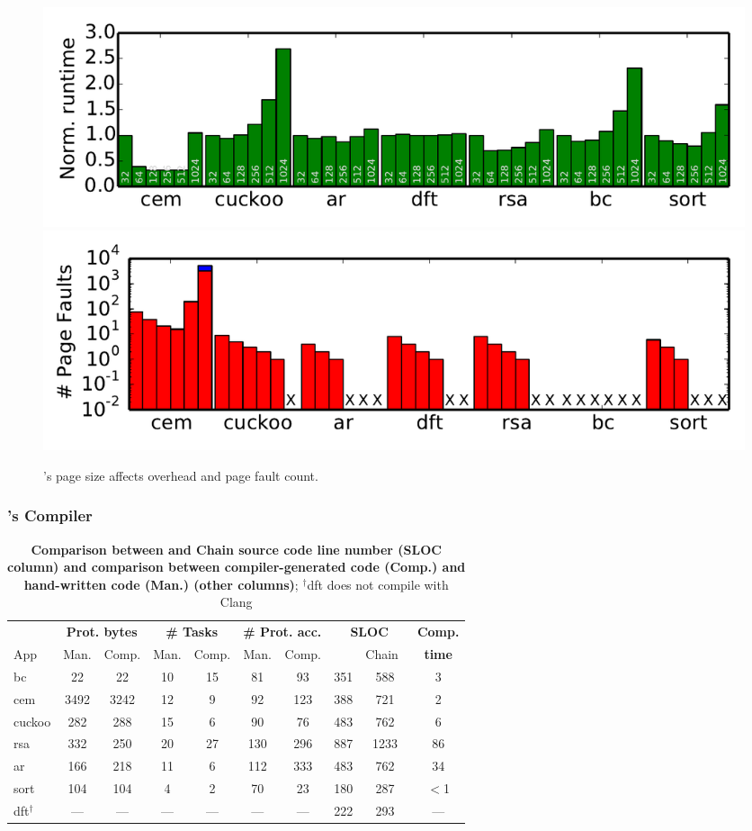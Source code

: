 \begin{figure}
	\centering
	\includegraphics[width=\columnwidth]{figures/ramPagsSizes}
	\includegraphics[width=\columnwidth]{figures/pagefault}
	\caption{\sys's page size affects overhead and page fault count.}
	\label{fig:IPOSPerformance}
	\label{fig:page_size}
\end{figure}

\subsubsection{\sys's Compiler}
\label{sec:result_compiler_time}

\begin{table}[t]
	\centering
	\footnotesize
	\renewcommand{\tabcolsep}{1pt}
	\begin{tabular}{|l|cc|cc|cc|cc|c|}
		\hline
		{} & \multicolumn{2}{c|}{{\bf Prot. bytes}} & \multicolumn{2}{c|}{{\bf \# Tasks}} & \multicolumn{2}{c|}{{\bf \# Prot. acc.}} & \multicolumn{2}{c|}{\bf SLOC} & {\bf Comp.} \\
		App & Man. & Comp. & Man. & Comp. & Man. & Comp. & \multicolumn{1}{l}{\sys} & \multicolumn{1}{r|}{Chain~\cite{chain}} & {\bf time} \\
		\hline\hline
		bc & 22 & 22 & 10 & 15 & 81 & 93 & 351 &588 & 3\\
		cem & 3492 & 3242 & 12 & 9 & 92 & 123 & 388 &721 & 2\\
		cuckoo & 282 & 288 & 15 & 6 & 90 & 76 & 483 &762 & 6\\
		rsa & 332 & 250 & 20 & 27 & 130 & 296 & 887 &1233 & 86\\
		ar & 166 & 218 & 11 & 6 & 112 & 333 & 483 &762 & 34\\
		sort & 104 & 104 & 4 & 2 & 70 & 23 & 180 & 287 & $<$1\\
		dft$^\dagger$ & --- & --- & --- & --- & --- & --- & 222 & 293 & ---\\
		\hline
	\end{tabular}
	\caption{\textbf{Comparison between \sys and Chain source code line number (SLOC column) and comparison between compiler-generated \sys code (Comp.) and hand-written \sys code (Man.) (other columns)}; $^\dagger$dft does not compile with Clang}\label{table:compiler_result}
\end{table}

